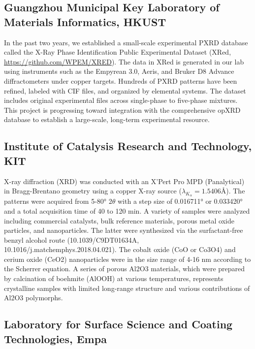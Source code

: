 \subsection*{Guangzhou Municipal Key Laboratory of Materials Informatics, HKUST}

In the past two years, we established a small-scale experimental PXRD database called the X-Ray Phase Identification Public Experimental Dataset (XRed,  \href{https://github.com/WPEM/XRED}{https://github.com/WPEM/XRED}). The data in XRed is generated in our lab using instruments such as the Empyrean 3.0, Aeris, and Bruker D8 Advance diffractometers under copper targets. Hundreds of PXRD patterns have been refined, labeled with CIF files, and organized by elemental systems. The dataset includes original experimental files across single-phase to five-phase mixtures. This project is progressing toward integration with the comprehensive opXRD database to establish a large-scale, long-term experimental resource. 

\subsection*{Institute of Catalysis Research and Technology, KIT}

X-ray diffraction (XRD) was conducted with an X’Pert Pro MPD (Panalytical) in Bragg-Brentano geometry using a copper X-ray source ($\lambda_{K_{\alpha}} = 1.5406 Å$). The patterns were acquired from 5-80° $2\theta$ with a step size of 0.016711° or 0.033420° and a total acquisition time of 40 to 120 min. A variety of samples were analyzed including commercial catalysts, bulk reference materials, porous metal oxide particles, and nanoparticles. The latter were synthesized via the surfactant-free benzyl alcohol route (10.1039/C9DT01634A, 10.1016/j.matchemphys.2018.04.021). The cobalt oxide (CoO or Co3O4) and cerium oxide (CeO2) nanoparticles were in the size range of 4-16 nm according to the Scherrer equation. A series of porous Al2O3 materials, which were prepared by calcination of boehmite (AlOOH) at various temperatures, represents crystalline samples with limited long-range structure and various contributions of Al2O3 polymorphs.

\subsection*{Laboratory for Surface Science and Coating Technologies, Empa}

